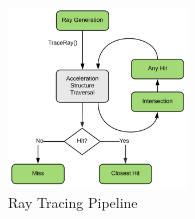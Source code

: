 \documentclass[xcolor=x11names,table]{beamer}
\begin{document}
\begin{frame}[allowframebreaks]
        
                
        \begin{figure}
            \centering
            \includegraphics[height=180px]{refs/raytrace_01-625x630.png}
            \caption{Ray Tracing Pipeline}
            \label{fig:rayTracingFlownVidia}
        \end{figure}
        
    \end{frame}
\end{document}
